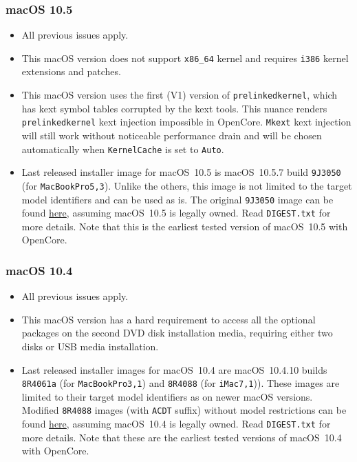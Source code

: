 \documentclass[]{article}
\begin{document}
\subsubsection{macOS 10.5}\label{legacy105}

\begin{itemize}
  \item All previous issues apply.
  \item This macOS version does not support \texttt{x86\_64} kernel
    and requires \texttt{i386} kernel extensions and patches.
  \item This macOS version uses the first (V1) version of \texttt{prelinkedkernel},
    which has kext symbol tables corrupted by the kext tools. This nuance
    renders \texttt{prelinkedkernel} kext injection impossible in OpenCore.
    \texttt{Mkext} kext injection will still work without noticeable
    performance drain and will be chosen automatically when
    \texttt{KernelCache} is set to \texttt{Auto}.
  \item Last released installer image for macOS~10.5 is macOS~10.5.7
    build \texttt{9J3050} (for \texttt{MacBookPro5,3}). Unlike the others,
    this image is not limited to the target model identifiers and can be used
    as is. The original \texttt{9J3050} image can be found
    \href{https://mega.nz/folder/inRBTarD#zanf7fUbviwz3WHBU5xpCg}{here},
    assuming macOS~10.5 is legally owned. Read \texttt{DIGEST.txt}
    for more details. Note that this is the earliest tested
    version of macOS~10.5 with OpenCore.
\end{itemize}

\subsubsection{macOS 10.4}\label{legacy104}

\begin{itemize}
  \item All previous issues apply.
  \item This macOS version has a hard requirement to access all the optional
    packages on the second DVD disk installation media, requiring either two
    disks or USB media installation.
  \item Last released installer images for macOS~10.4 are macOS~10.4.10
    builds \texttt{8R4061a} (for \texttt{MacBookPro3,1}) and
    \texttt{8R4088} (for \texttt{iMac7,1})). These images are limited
    to their target model identifiers as on newer macOS versions.
    Modified \texttt{8R4088} images (with \texttt{ACDT} suffix) without
    model restrictions can be found
    \href{https://mega.nz/folder/D3ASzLzA\#7sjYXE2X09f6aGjol\_C7dg}{here},
    assuming macOS~10.4 is legally owned. Read \texttt{DIGEST.txt}
    for more details. Note that these are the earliest tested
    versions of macOS~10.4 with OpenCore.
\end{itemize}
\end{document}
